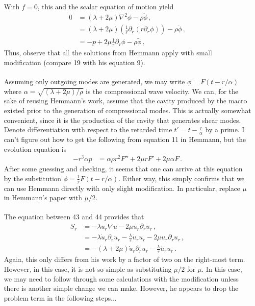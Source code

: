 \documentclass{article}
\newcommand*\p[1]{\left(#1\right)}
\newcommand*\f[2]{\frac{#1}{#2}}
\begin{document}
With $f=0$, this and the scalar equation of motion yield
\begin{align}
0&=(\lambda+2\mu)\nabla^2\phi-\rho\ddot\phi\,,\\
&=(\lambda+2\mu)\p{\f1r\partial_r\p{r\partial_r\phi}}-\rho\ddot\phi\,,\\
&=-p+2\mu\f1r\partial_r\phi-\rho\ddot\phi\,,
\end{align}
Thus, observe that all the solutions from Hemmann apply with small modification (compare 19 with his equation 9).
\\\\
Assuming only outgoing modes are generated, we may write $\phi=F(t-r/\alpha)$ where $\alpha=\sqrt{(\lambda+2\mu)/\rho}$ is the compressional wave velocity. We can, for the sake of reusing Hemmann's work, assume that the cavity produced by the macro existed prior to the generation of compressional modes. This is actually somewhat convenient, since it is the production of the cavity that generates shear modes. Denote differentiation with respect to the retarded time $t'=t-\f r\alpha$ by a prime. I can't figure out how to get the following from equation 11 in Hemmann, but the evolution equation is
\begin{align}
-r^3\alpha p&=\alpha\rho r^2 F''+2\mu r F'+2\mu\alpha F\,.
\end{align}
After some guessing and checking, it seems that one can arrive at this equation by the substitution $\phi=\f1rF(t-r/\alpha)$. Either way, this simply confirms that we can use Hemmann directly with only slight modification. In particular, replace $\mu$ in Hemmann's paper with $\mu/2$.
\\\\
The equation between 43 and 44 provides that
\begin{align}
S_r&=-\lambda \dot u_r \nabla u -2\mu u_r \partial_r u_r\,,\\
&=-\lambda \dot u_r\partial_r u_r-\f{\lambda}{r} \dot u_r u_r -2\mu u_r \partial_r u_r\,,\\
&=-(\lambda+2\mu) \dot u_r\partial_r u_r-\f{\lambda}{r} \dot u_r u_r\,.
\end{align}
Again, this only differs from his work by a factor of two on the right-most term. However, in this case, it is not so simple as substituting $\mu/2$ for $\mu$. In this case, we may need to follow through some calculations with the modification unless there is another simple change we can make. However, he appears to drop the problem term in the following steps...
\\\\
\end{document}
